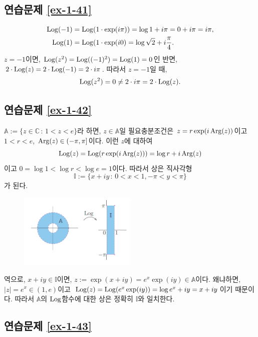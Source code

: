 \subsection*{연습문제 \ref{ex-1-41}}

\begin{align*}
\mathop{\mathrm{Log}}(-1) &= \mathop{\mathrm{Log}}(1\cdot \exp(i\pi)) = \log1 +i\pi = 0 + i\pi = i\pi, \\
\mathop{\mathrm{Log}}(1) &= \mathop{\mathrm{Log}}(1\cdot \exp(i0) = \log\sqrt{2} + i \displaystyle\frac\pi4.
\end{align*}
$z=-1$이면,
$\mathop{\mathrm{Log}}(z^2) = \mathop{\mathrm{Log}}((-1)^2) = \mathop{\mathrm{Log}}(1) = 0$인 반면,
$2\cdot\mathop{\mathrm{Log}}(z) = 2\cdot \mathop{\mathrm{Log}}(-1) = 2\cdot i\pi$. 
따라서 $z=-1$일 때,
\[
\mathop{\mathrm{Log}}(z^2) = 0 \ne 2\cdot i\pi = 2\cdot \mathop{\mathrm{Log}}(z).
\]

\subsection*{연습문제 \ref{ex-1-42}}

$\mathbb A:= \{ z \in \mathbb C \,:\, 1 < z < e \}$라 하면,
$z\in \mathbb A$일 필요충분조건은 $ z=r\exp(i\mathop{\mathrm{Arg}}(z))$이고
$1<r<e$, $\mathop{\mathrm{Arg}}(z)\in (-\pi,\pi]$이다.
이런 $z$에 대하여
\[
\mathop{\mathrm{Log}}(z) = \mathop{\mathrm{Log}}(r\exp(i\mathop{\mathrm{Arg}}(z))) = \log r + i\mathop{\mathrm{Arg}}(z)
\]
이고 $0=\log 1 < \log r < \log e = 1$이다.
따라서 상은 직사각형
\[
\mathbb I := \{ x+iy\,:\, 0<x<1, -\pi <y<\pi \}
\]
가 된다.

\begin{figure}[h!]
\begin{center}
\includegraphics[width=0.5\textwidth]{./figs/fig-s-0-5}
\end{center}
\end{figure}

역으로, $x+iy\in\mathbb I$이면,
$z:= \exp(x+iy) = e^x\exp(iy)\in \mathbb A$이다.
왜냐하면, $|z|=e^x \in (1,e)$이고 
$\mathop{\mathrm{Log}}(z) = \mathop{\mathrm{Log}} (e^x \exp(iy)) = \log e^x + iy = x+iy$이기 때문이다.
따라서 $\mathbb A$의 $\mathop{\mathrm{Log}}$함수에 대한 상은 정확히 $\mathbb I$와 일치한다.

\subsection*{연습문제 \ref{ex-1-43}}

